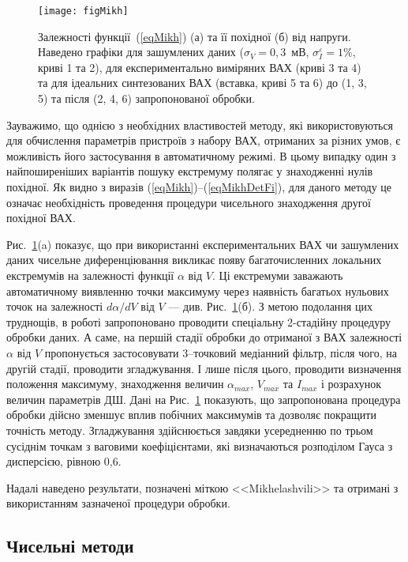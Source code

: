 \documentclass[a4paper,14pt,oneside,openany]{memoir}
\begin{document}
\begin{figure}
\center
\texttt{[image: figMikh]}%
\caption{\label{figMikh}
Залежності функції~(\ref{eqMikh}) (а) та її похідної (б) від напруги.
Наведено графіки для зашумлених даних ($\sigma_V=0,3$~мВ, $\sigma_I^\varepsilon=1\%$, криві 1 та 2), для експериментально виміряних ВАХ (криві 3 та 4) та для ідеальних синтезованих ВАХ (вставка, криві 5 та 6) до (1, 3, 5) та після (2, 4, 6) запропонованої обробки.
}
\end{figure}

Зауважимо, що однією з необхідних властивостей методу, які використовуються для обчислення параметрів пристроїв з набору ВАХ, отриманих за різних умов, є можливість його застосування в автоматичному режимі.
В цьому випадку один з найпоширеніших варіантів пошуку екстремуму полягає у знаходженні нулів похідної.
Як видно з виразів (\ref{eqMikh})--(\ref{eqMikhDetFi}), для даного методу це означає необхідність проведення процедури чисельного знаходження другої похідної ВАХ.


Рис.~\ref{figMikh}(a) показує, що при використанні експериментальних ВАХ чи зашумлених даних чисельне диференціювання викликає появу багаточисленних локальних екстремумів на залежності функції $\alpha$ від $V$.
Ці екстремуми заважають автоматичному виявленню точки максимуму через наявність багатьох нульових точок на залежності $d\alpha/dV$ від $V$ --- див. Рис.~\ref{figMikh}(б).
З метою подолання цих труднощів, в роботі запропоновано проводити спеціальну 2-стадійну процедуру обробки даних.
А саме, на першій стадії обробки до отриманої з ВАХ залежності $\alpha$ від $V$ пропонується застосовувати 3--точковий медіанний фільтр, після чого, на другій стадії, проводити згладжування.
І лише після цього, проводити визначення положення максимуму, знаходження величин $\alpha_{max}$, $V_{max}$  та $I_{max}$ і розрахунок величин параметрів ДШ.
Дані на Рис.~\ref{figMikh} показують, що запропонована процедура обробки дійсно зменшує вплив побічних максимумів та дозволяє покращити точність методу.
Згладжування здійснюється завдяки усередненню по трьом сусіднім точкам з ваговими коефіцієнтами, які визначаються розподілом Гауса з дисперсією, рівною 0,6.

Надалі наведено результати, позначені міткою <<Mikhelashvili>> та отримані з використанням зазначеної процедури обробки.


\subsection{Чисельні методи}
\end{document}
